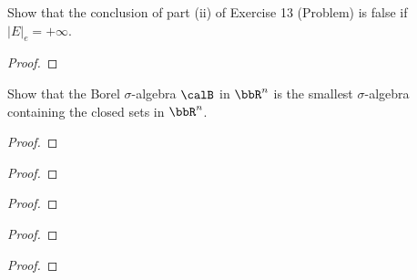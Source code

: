 \begin{problem}
Show that the conclusion of part  (ii) of Exercise 13 (Problem) is false if
$\left|E\right|_e=+\infty$.
\end{problem}
\begin{proof}
\end{proof}
\newpage

\begin{problem}
Show that the Borel $\sigma$-algebra $\calB$ in $\bbR^n$ is the smallest
$\sigma$-algebra containing the closed sets in $\bbR^n$.
\end{problem}
\begin{proof}
\end{proof}
\newpage

\begin{problem}
\end{problem}
\begin{proof}
\end{proof}
\newpage

\begin{problem}
\end{problem}
\begin{proof}
\end{proof}
\newpage

\begin{problem}
\end{problem}
\begin{proof}
\end{proof}
\newpage

\begin{problem}
\end{problem}
\begin{proof}
\end{proof}

